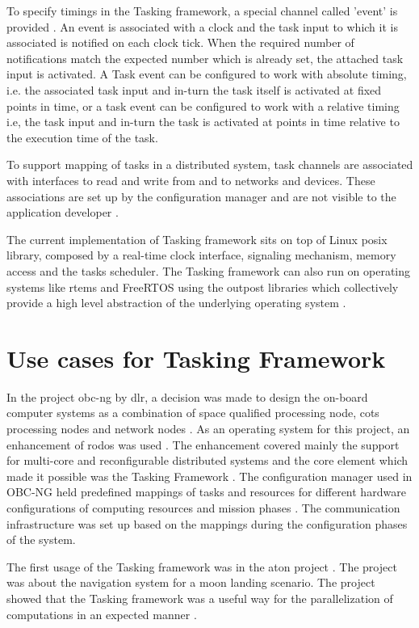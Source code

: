 To specify timings in the Tasking framework, a special channel called 'event' is provided \cite{TaskFr}. An event is associated with a clock and the task input to which it is associated is notified on each clock tick. When the required number of notifications match the expected number which is already set, the attached task input is activated. A Task event can be configured to work with absolute timing, i.e. the associated task input and in-turn the task itself is activated at fixed points in time, or a task event can be configured to work with a relative timing i.e, the task input and in-turn the task is activated at points in time relative to the execution time of the task.

To support mapping of tasks in a distributed system, task channels are associated with interfaces to read and write from and to networks and devices. These associations are set up by the configuration manager and are not visible to the application developer \cite{TaskFr}.

The current implementation of Tasking framework sits on top of Linux \ac{posix} library, composed by a real-time clock interface, signaling mechanism, memory access and the tasks scheduler. The Tasking framework can also run on operating systems like \ac{rtems} and FreeRTOS using the outpost libraries which collectively provide a high level abstraction of the underlying operating system \cite{TaskFr}.

\section{Use cases for Tasking Framework}
In the project \ac{obc-ng} by \ac{dlr}, a decision was made to design the on-board computer systems as a combination of space qualified processing node, \ac{cots} processing nodes and network nodes \cite{TaskFr}. As an operating system for this project, an enhancement of \ac{rodos} was used \cite{TaskFr}\cite{OBC-NG}. The enhancement covered mainly the support for multi-core and reconfigurable distributed systems \cite{RODOS} and the core element which made it possible was the Tasking Framework \cite{TaskFr}. The configuration manager used in OBC-NG held predefined mappings of tasks and resources for different hardware configurations of computing resources and mission phases \cite{OBC-NG}. The communication infrastructure was set up based on the mappings during the configuration phases of the system. 

The first usage of the Tasking framework was in the \ac{aton} project \cite{ATON}. The project was about the navigation system for a moon landing scenario. The project showed that the Tasking framework was a useful way for the parallelization of computations in an expected manner \cite{ATON}.

